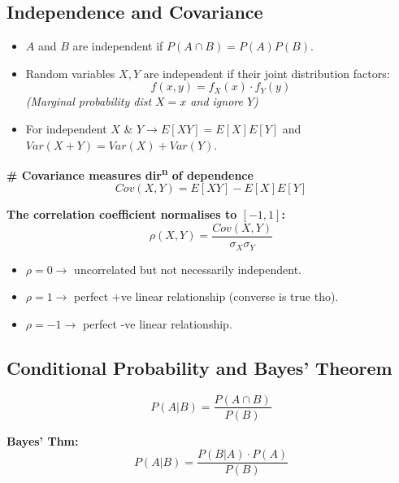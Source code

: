 \documentclass[11pt,a4paper]{article}
\begin{document}
\subsection*{Independence and Covariance}
\begin{itemize}
    \item $A$ and $B$ are independent if $P(A \cap B) = P(A)P(B)$.
    \item Random variables $X, Y$ are independent if their joint distribution factors: 
    \[ f(x,y) = f_X(x) \cdot f_Y(y) \]
    \textit{(Marginal probability dist $X=x$ and ignore $Y$)}
    \item For independent $X$ \& $Y \rightarrow E[XY] = E[X]E[Y]$ and $Var(X+Y) = Var(X) + Var(Y)$.
\end{itemize}

\textbf{\# Covariance measures dir\textsuperscript{n} of dependence}
\[ Cov(X,Y) = E[XY] - E[X]E[Y] \]

\textbf{The correlation coefficient normalises to $[-1, 1]$:}
\[ \rho(X,Y) = \frac{Cov(X,Y)}{\sigma_X \sigma_Y} \]
\begin{itemize}
    \item $\rho = 0 \rightarrow$ uncorrelated but not necessarily independent.
    \item $\rho = 1 \rightarrow$ perfect +ve linear relationship (converse is true tho).
    \item $\rho = -1 \rightarrow$ perfect -ve linear relationship.
\end{itemize}

\subsection*{Conditional Probability and Bayes' Theorem}
\[ P(A|B) = \frac{P(A \cap B)}{P(B)} \]

\textbf{Bayes' Thm:}
\[ P(A|B) = \frac{P(B|A) \cdot P(A)}{P(B)} \]
\end{document}
